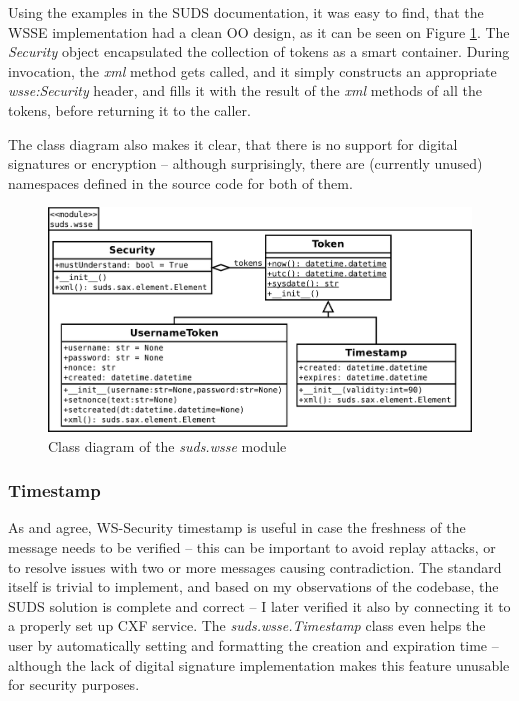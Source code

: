 Using the examples in the SUDS documentation, it was easy to find, that the WSSE implementation had a clean OO design, as it can be seen on Figure \ref{fig:clsdSudsWsse}. The \emph{Security} object encapsulated the collection of tokens as a smart container. During invocation, the \emph{xml} method gets called, and it simply constructs an appropriate \emph{wsse:Security} header, and fills it with the result of the \emph{xml} methods of all the tokens, before returning it to the caller.

The class diagram also makes it clear, that there is no support for digital signatures or encryption -- although surprisingly, there are (currently unused) namespaces defined in the source code for both of them.

\begin{figure}[htbp]
 \centering
 \includegraphics[width=12cm]{images/clsdSudsWsse.pdf}
 \caption{Class diagram of the \emph{suds.wsse} module}
 \label{fig:clsdSudsWsse}
\end{figure}

\subsubsection{Timestamp}

As \cite{ibm-timestamp} and \cite{msdn-wss} agree, WS\hyp{}Security timestamp is useful in case the freshness of the message needs to be verified -- this can be important to avoid replay attacks, or to resolve issues with two or more messages causing contradiction. The standard itself is trivial to implement, and based on my observations of the codebase, the SUDS solution is complete and correct -- I later verified it also by connecting it to a properly set up CXF service. The \emph{suds.wsse.Timestamp} class even helps the user by automatically setting and formatting the creation and expiration time -- although the lack of digital signature implementation makes this feature unusable for security purposes.


